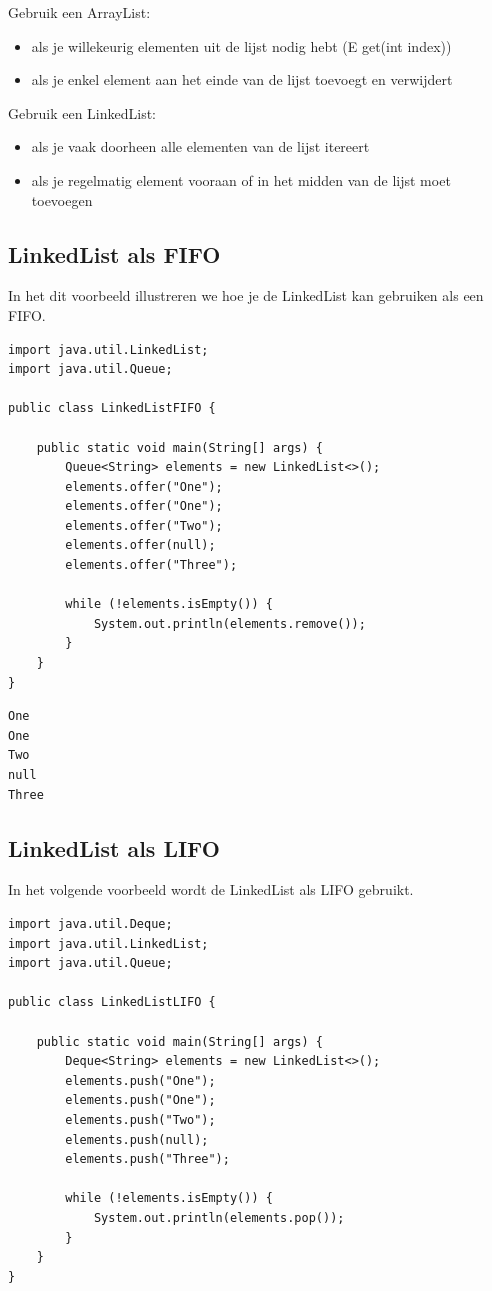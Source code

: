 \documentclass{tstextbook}
\begin{document}
Gebruik een ArrayList:
\begin{itemize}
\item als je willekeurig elementen uit de lijst nodig hebt (E get(int index))
\item als je enkel element aan het einde van de lijst toevoegt en verwijdert
\end{itemize}

Gebruik een LinkedList:
\begin{itemize}
\item als je vaak doorheen alle elementen van de lijst itereert
\item als je regelmatig element vooraan of in het midden van de lijst moet toevoegen
\end{itemize}

\subsection{LinkedList als FIFO}
In het dit voorbeeld illustreren we hoe je de LinkedList kan gebruiken als een FIFO.

\begin{lstlisting}
import java.util.LinkedList;
import java.util.Queue;

public class LinkedListFIFO {

	public static void main(String[] args) {
		Queue<String> elements = new LinkedList<>();
		elements.offer("One");
		elements.offer("One");
		elements.offer("Two");
		elements.offer(null);
		elements.offer("Three");

		while (!elements.isEmpty()) {
			System.out.println(elements.remove());
		}
	}
}
\end{lstlisting}

\begin{verbatim}
One
One
Two
null
Three
\end{verbatim}


\subsection{LinkedList als LIFO}
In het volgende voorbeeld wordt de LinkedList als LIFO gebruikt.

\begin{lstlisting}
import java.util.Deque;
import java.util.LinkedList;
import java.util.Queue;

public class LinkedListLIFO {

	public static void main(String[] args) {
		Deque<String> elements = new LinkedList<>();
		elements.push("One");
		elements.push("One");
		elements.push("Two");
		elements.push(null);
		elements.push("Three");

		while (!elements.isEmpty()) {
			System.out.println(elements.pop());
		}
	}
}
\end{lstlisting}
\end{document}
